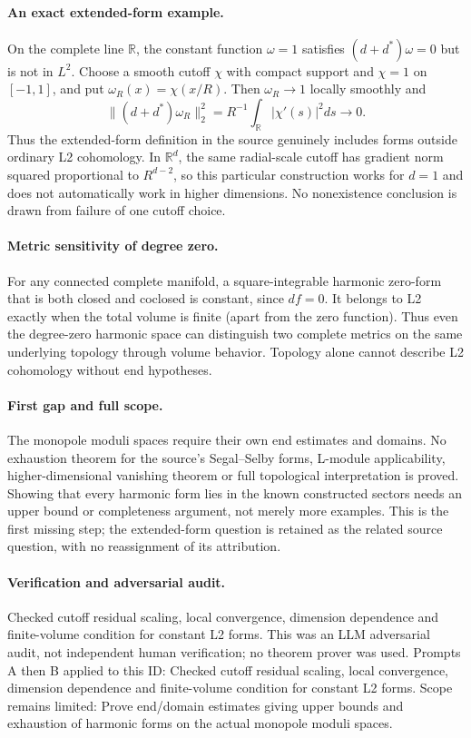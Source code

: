 \documentclass[11pt]{article}
\begin{document}
\paragraph{An exact extended-form example.}On the complete line \(\mathbb R\), the constant function \(\omega=1\) satisfies \((d+d^*)\omega=0\) but is not in \(L^2\). Choose a smooth cutoff \(\chi\) with compact support and \(\chi=1\) on \([-1,1]\), and put \(\omega_R(x)=\chi(x/R)\). Then \(\omega_R\to1\) locally smoothly and
\[\|(d+d^*)\omega_R\|_2^2=R^{-1}\int_{\mathbb R}|\chi'(s)|^2ds\longrightarrow0.
\]
Thus the extended-form definition in the source genuinely includes forms outside ordinary L2 cohomology. In \(\mathbb R^d\), the same radial-scale cutoff has gradient norm squared proportional to \(R^{d-2}\), so this particular construction works for \(d=1\) and does not automatically work in higher dimensions. No nonexistence conclusion is drawn from failure of one cutoff choice.
\paragraph{Metric sensitivity of degree zero.}For any connected complete manifold, a square-integrable harmonic zero-form that is both closed and coclosed is constant, since \(df=0\). It belongs to L2 exactly when the total volume is finite (apart from the zero function). Thus even the degree-zero harmonic space can distinguish two complete metrics on the same underlying topology through volume behavior. Topology alone cannot describe L2 cohomology without end hypotheses.
\paragraph{First gap and full scope.}The monopole moduli spaces require their own end estimates and domains. No exhaustion theorem for the source's Segal--Selby forms, L-module applicability, higher-dimensional vanishing theorem or full topological interpretation is proved. Showing that every harmonic form lies in the known constructed sectors needs an upper bound or completeness argument, not merely more examples. This is the first missing step; the extended-form question is retained as the related source question, with no reassignment of its attribution.

\paragraph{Verification and adversarial audit.}
Checked cutoff residual scaling, local convergence, dimension dependence and finite-volume condition for constant L2 forms. This was an LLM adversarial audit, not independent human verification; no theorem prover was used. Prompts A then B applied to this ID: Checked cutoff residual scaling, local convergence, dimension dependence and finite-volume condition for constant L2 forms. Scope remains limited: Prove end/domain estimates giving upper bounds and exhaustion of harmonic forms on the actual monopole moduli spaces.
\end{document}
